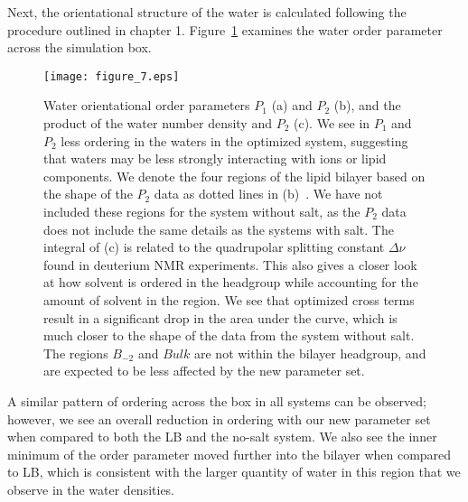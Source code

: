 Next, the orientational structure of the water is calculated following the procedure outlined in chapter 1.
Figure~\ref{figch2:waterorder} examines the water order parameter across the simulation box. 
\begin{figure}[H]
    \caption[Water orientational order parameters]{ Water orientational order parameters $P_1$ (a) and $P_2$ (b), 
and the product of the water number density and $P_2$ (c). We see in $P_1$ and $P_2$ less
    ordering in the waters in the optimized system, suggesting that waters may be less strongly interacting with ions or lipid components. We denote the four regions of the lipid bilayer based on the shape of the $P_2$ data as dotted lines
    in (b)~\cite{saunders:2019}. We have not included these regions
 for the system without salt, as the $P_2$ data does not include the same details as the systems with salt. The integral of (c) is related to the
 quadrupolar splitting constant $\Delta \nu$ found in deuterium NMR experiments. This also gives a closer look at how solvent is ordered in the headgroup while
 accounting for the amount of solvent in the region. We see that optimized cross terms result in a significant drop in the area under the curve, which is much closer
 to the shape of the data from the system without salt. 
 The regions $B_{-2}$ and $Bulk$ are not within the bilayer
headgroup, and are expected to be less affected by the new parameter set.}
    \label{figch2:waterorder}
    \texttt{[image: figure\_7.eps]}
\end{figure}
A similar pattern of ordering across the box in all systems can be observed; 
however, we see an overall reduction in ordering with our new parameter set when
compared to both the LB and the no-salt system. 
We also see the inner minimum of the order parameter moved further into the bilayer
when compared to LB, 
which is consistent with the larger quantity of water 
in this region that we observe in the water densities.

